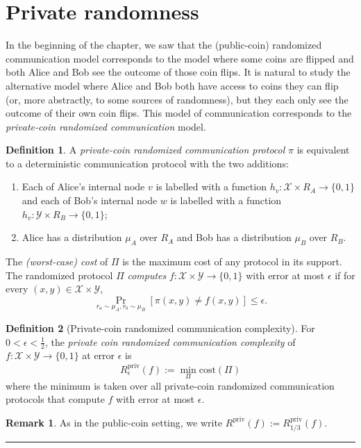 \documentclass[11pt]{amsart}
\theoremstyle{plain}
\theoremstyle{definition}
\newtheorem{definition}{Definition}
\newtheorem{remark}{Remark}
\theoremstyle{plain}
\newcommand{\calX}{\mathcal{X}}
\newcommand{\calY}{\mathcal{Y}}
\newcommand{\cost}{\mathrm{cost}}
\newcommand{\Rpriv}{R^{\mathrm{priv}}}
\newcommand{\exercises}{\bigskip \noindent\rule{8cm}{0.4pt} \medskip}
\begin{document}
\newpage 
\section{Private randomness}

In the beginning of the chapter, we saw that the (public-coin) randomized communication model corresponds to the model where some coins are flipped and both Alice and Bob see the outcome of those coin flips. It is natural to study the alternative model where Alice and Bob both have access to coins they can flip (or, more abstractly, to some sources of randomness), but they each only see the outcome of their own coin flips. This model of communication corresponds to the \emph{private-coin randomized communication} model.

\begin{definition}
A \emph{private-coin randomized communication protocol} $\pi$ is equivalent to a deterministic communication protocol with the two additions: 
\begin{enumerate}
\item Each of Alice's internal node $v$ is labelled with a function $h_v : \calX \times R_A \to \{0,1\}$ and each of Bob's internal node $w$ is labelled with a function $h_v : \calY \times R_B \to \{0,1\}$; 
\item Alice has a distribution $\mu_A$ over $R_A$ and Bob has a distribution $\mu_B$ over $R_B$.
\end{enumerate}
The \emph{(worst-case) cost} of $\Pi$ is the maximum cost of any protocol in its support. The randomized protocol $\Pi$ \emph{computes} $f : \calX \times \calY \to \{0,1\}$ with error at most $\epsilon$ if for every $(x,y) \in \calX \times \calY$,
\[
\Pr_{r_a \sim \mu_A, r_b \sim \mu_B}[ \pi(x,y) \neq f(x,y) ] \le \epsilon.
\]
\end{definition}


\begin{definition}[Private-coin randomized communication complexity]
For $0 < \epsilon < \frac12$, the \emph{private coin randomized communication complexity} of $f : \calX \times \calY \to \{0,1\}$ at error $\epsilon$ is
\[
\Rpriv_\epsilon(f) := \min_{\Pi} \cost(\Pi)
\]
where the minimum is taken over all private-coin randomized communication protocols that compute $f$ with error at most $\epsilon$.
\end{definition}

\begin{remark}
As in the public-coin setting, we write $\Rpriv(f) := \Rpriv_{1/3}(f)$.
\end{remark}
\exercises
\end{document}
